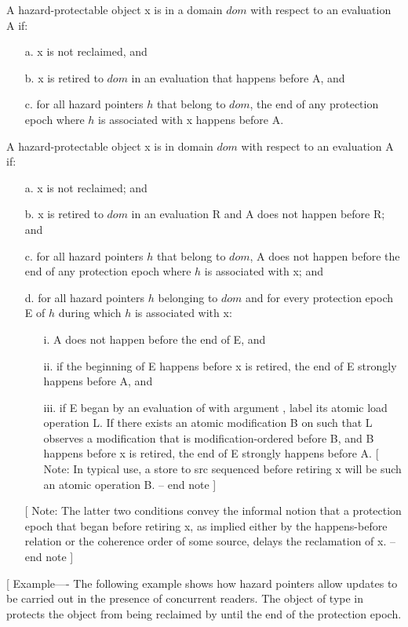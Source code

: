 \pnum
A hazard-protectable object x is  in a domain $dom$ with respect to
an evaluation A if:
\begin{itemize}
\item[a.] x is not reclaimed, and
\item[b.] x is retired to $dom$ in an evaluation that happens before A, and
\item[c.] for all hazard pointers $h$ that belong to $dom$, the end of any protection epoch where $h$ is associated with x happens before A.
\end{itemize}

\pnum
A hazard-protectable object x is  in domain $dom$ with respect to an
evaluation A if:
\begin{itemize}
\item[a.] x is not reclaimed; and
\item[b.] x is retired to $dom$ in an evaluation R and A does not happen before R; and
\item[c.] for all hazard pointers $h$ that belong to $dom$, A does not happen before the end of
any protection epoch where $h$ is associated with x; and
\item[d.] for all hazard pointers $h$ belonging to $dom$ and for every protection epoch E of $h$
during which $h$ is associated with x:
\begin{itemize}
  \item[i.] A does not happen before the end of E, and
  \item[ii.] if the beginning of E happens before x is retired, the end of E strongly
happens before A, and
  \item[iii.] if E began by an evaluation of  with argument , label its
atomic load operation L. If there exists an atomic modification B on  such that L observes a modification that is modification-ordered before B, and B happens before x is retired, the end of E strongly happens before A. [ Note: In typical use, a store to src sequenced before retiring x will be such an atomic operation B. -- end note ]
\end{itemize}
[ Note: The latter two conditions convey the informal notion that a protection
epoch that began before retiring x, as implied either by the happens-before
relation or the coherence order of some source, delays the reclamation of x. -- end note ]
\end{itemize}

[ Example—- The following example shows how hazard pointers allow updates to be carried out in the presence of concurrent readers. The object of type  in  protects the object  from being reclaimed by  until the end of the protection epoch.


